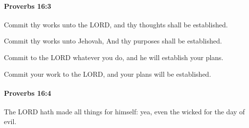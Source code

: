 		\paragraph{Proverbs 16:3} %
			\label{PROVERBS-16-3}

			Commit thy works unto the LORD, and thy thoughts shall be established.

			\begin{versebox}
					\item[BHS] 
					\item[ASV] Commit thy works unto Jehovah, And thy purposes shall be established.
					\item[NIV] Commit to the LORD whatever you do, and he will establish your plans.
					\item[NRSV] Commit your work to the LORD, and your plans will be established.
			\end{versebox}

		\paragraph{Proverbs 16:4} %
			\label{PROVERBS-16-4}

			The LORD hath made all things for himself: yea, even the wicked for the day of evil.

